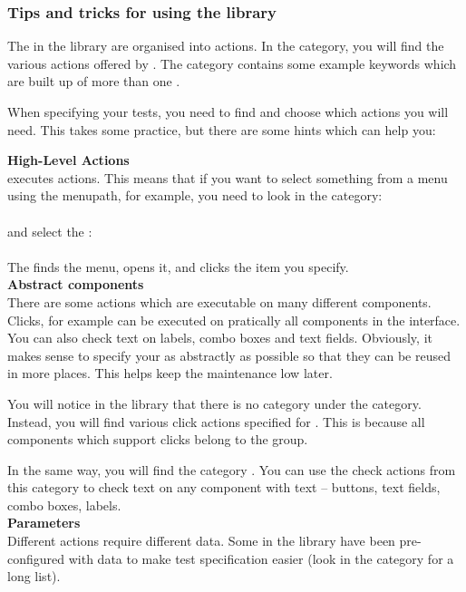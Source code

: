 \subsubsection{Tips and tricks for using the \gdcase{} library}
\label{UnderstandingLibrary}
The \gdcases{} in the library are organised into actions. In the  category, you will find the various actions offered by \app{}. The  category contains some example keywords which are built up of more than one \gdcase{}. 

When specifying your tests, you need to find and choose which actions you will need. This takes some practice, but there are some hints which can help you:

\textbf{High-Level Actions}\\
\app{} executes  actions. This means that if you want to select something from a menu using the menupath, for example, you need to look in the category:\\
\\
and select the \gdcase{}:\\
\\
The \gdcase{} finds the menu, opens it, and clicks the item you specify. \\

\textbf{Abstract components}\\
There are some actions which are executable on many different components. Clicks, for example can be executed on pratically all components in the interface. You can also check text on labels, combo boxes and text fields. Obviously, it makes sense to specify your \gdcases{} as abstractly as possible so that they can be reused in more places. This helps keep the maintenance low later. 

You will notice in the library that there is no  category under the  category. Instead, you will find various click actions specified for . This is because all components which support clicks belong to the  group. 

In the same way, you will find the category . You can use the check actions from this category to check text on any component with text -- buttons, text fields, combo boxes, labels. \\

\textbf{Parameters}\\
Different actions require different data. Some \gdcases{} in the library have been pre-configured with data to make test specification easier (look in the category  for a long list). 

